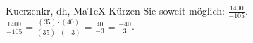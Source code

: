 \begin{MAufgabe}{Kuerzen}{kr, dh, MaTeX}
K\"urzen Sie soweit m\"oglich: $\frac{1400}{-105}$.\\ 
\ifLsg\MLoesung
\quad $\frac{1400}{-105}=\frac{(35)\cdot(40)}{(35)\cdot(-3)}=\frac{40}{-3}=\frac{-40}{3}$.\else\relax\fi
 \end{MAufgabe}
